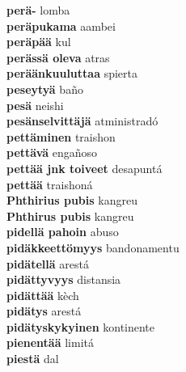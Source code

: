 \textbf{ perä-  } lomba \\
\textbf{ peräpukama  } aambei \\
\textbf{ peräpää  } kul \\
\textbf{ perässä oleva  } atras \\
\textbf{ peräänkuuluttaa  } spierta \\
\textbf{ peseytyä  } baño \\
\textbf{ pesä  } neishi \\
\textbf{ pesänselvittäjä  } atministradó \\
\textbf{ pettäminen  } traishon \\
\textbf{ pettävä  } engañoso \\
\textbf{ pettää jnk toiveet  } desapuntá \\
\textbf{ pettää  } traishoná \\
\textbf{ Phthirius pubis  } kangreu \\
\textbf{ Phthirus pubis  } kangreu \\
\textbf{ pidellä pahoin  } abuso \\
\textbf{ pidäkkeettömyys  } bandonamentu \\
\textbf{ pidätellä  } arestá \\
\textbf{ pidättyvyys  } distansia \\
\textbf{ pidättää  } kèch \\
\textbf{ pidätys  } arestá \\
\textbf{ pidätyskykyinen  } kontinente \\
\textbf{ pienentää  } limitá \\
\textbf{ piestä  } dal \\
